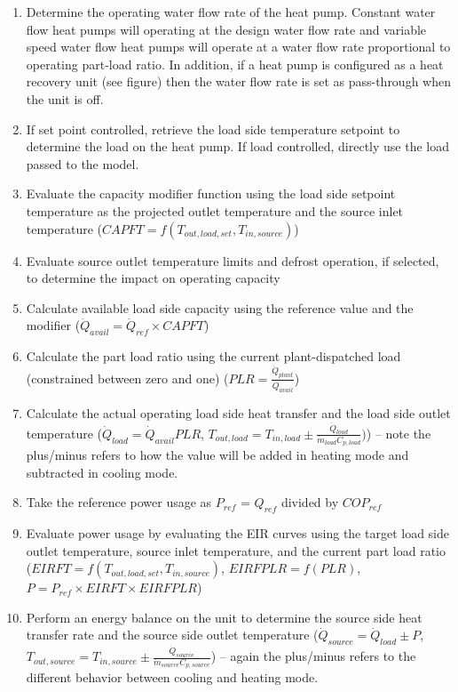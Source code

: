 \begin{enumerate}
      \item Determine the operating water flow rate of the heat pump. Constant water flow heat pumps will operating at the design water flow rate and variable speed water flow heat pumps will operate at a water flow rate proportional to operating part-load ratio. In addition, if a heat pump is configured as a heat recovery unit (see figure) then the water flow rate is set as pass-through when the unit is off.
	\item If set point controlled, retrieve the load side temperature setpoint to determine the load on the heat pump. If load controlled, directly use the load passed to the model.
	\item Evaluate the capacity modifier function using the load side setpoint temperature as the projected outlet temperature and the source inlet temperature ($CAPFT = f(T_{out,load,set}, T_{in,source}) $)
     \item Evaluate source outlet temperature limits and defrost operation, if selected, to determine the impact on operating capacity
	\item Calculate available load side capacity using the reference value and the modifier ($\dot{Q}_{avail} = \dot{Q}_{ref} \times CAPFT$)
	\item Calculate the part load ratio using the current plant-dispatched load (constrained between zero and one) ($PLR = \frac{\dot{Q}_{plant}}{\dot{Q}_{avail}}$)
	\item Calculate the actual operating load side heat transfer and the load side outlet temperature ($\dot{Q}_{load} = \dot{Q}_{avail}PLR$, $T_{out,load} = T_{in,load} \pm \frac{\dot{Q}_{load}}{\dot{m}_{load}C_{p,load}}) $) -- note the plus/minus refers to how the value will be added in heating mode and subtracted in cooling mode.
     \item Take the reference power usage as $P_{ref}$ = $Q_{ref}$ divided by $COP_{ref}$
	\item Evaluate power usage by evaluating the EIR curves using the target load side outlet temperature, source inlet temperature, and the current part load ratio ($EIRFT = f(T_{out,load,set}, T_{in,source})$, $EIRFPLR = f(PLR)$, $P = P_{ref} \times EIRFT \times EIRFPLR$)
	\item Perform an energy balance on the unit to determine the source side heat transfer rate and the source side outlet temperature ($\dot{Q}_{source} = \dot{Q}_{load} \pm P$, $T_{out,source} = T_{in,source} \pm \frac{\dot{Q}_{source}}{\dot{m}_{source}C_{p,source}} $) -- again the plus/minus refers to the different behavior between cooling and heating mode.
\end{enumerate}

